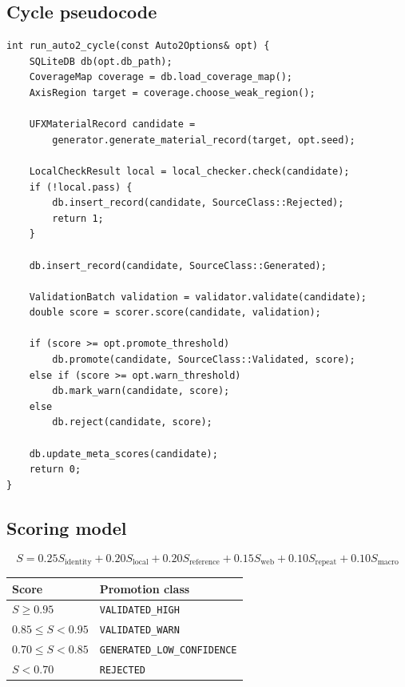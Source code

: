 \documentclass[11pt, a4paper]{article}
\begin{document}
\subsection{Cycle pseudocode}

\begin{lstlisting}
int run_auto2_cycle(const Auto2Options& opt) {
    SQLiteDB db(opt.db_path);
    CoverageMap coverage = db.load_coverage_map();
    AxisRegion target = coverage.choose_weak_region();

    UFXMaterialRecord candidate =
        generator.generate_material_record(target, opt.seed);

    LocalCheckResult local = local_checker.check(candidate);
    if (!local.pass) {
        db.insert_record(candidate, SourceClass::Rejected);
        return 1;
    }

    db.insert_record(candidate, SourceClass::Generated);

    ValidationBatch validation = validator.validate(candidate);
    double score = scorer.score(candidate, validation);

    if (score >= opt.promote_threshold)
        db.promote(candidate, SourceClass::Validated, score);
    else if (score >= opt.warn_threshold)
        db.mark_warn(candidate, score);
    else
        db.reject(candidate, score);

    db.update_meta_scores(candidate);
    return 0;
}
\end{lstlisting}

\subsection{Scoring model}

\begin{equation*}
S = 0.25 S_\text{identity} + 0.20 S_\text{local} + 0.20 S_\text{reference} + 0.15 S_\text{web} + 0.10 S_\text{repeat} + 0.10 S_\text{macro}
\end{equation*}

\begin{center}
\begin{tabular}{ll}
\toprule
\textbf{Score} & \textbf{Promotion class} \\
\midrule
$S \geq 0.95$          & \texttt{VALIDATED\_HIGH} \\
$0.85 \leq S < 0.95$   & \texttt{VALIDATED\_WARN} \\
$0.70 \leq S < 0.85$   & \texttt{GENERATED\_LOW\_CONFIDENCE} \\
$S < 0.70$             & \texttt{REJECTED} \\
\bottomrule
\end{tabular}
\end{center}
\end{document}
